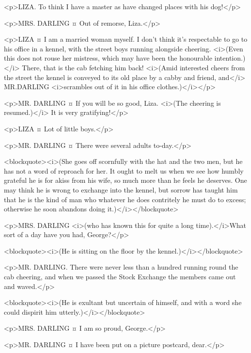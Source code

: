 <p>LIZA. To think I have a master as have changed places with his dog!</p>

<p>MRS. DARLING ¤
Out of remorse, Liza.</p>

<p>LIZA ¤
I am a married woman myself. I don't think it's respectable to go to his office in a kennel, with the street boys running alongside cheering. <i>(Even this does not rouse her mistress, which may have been the honourable intention.)</i> There, that is the cab fetching him back! <i>(Amid interested cheers from the street the kennel is conveyed to its old place by a cabby and friend, and</i> MR.DARLING <i>scrambles out of it in his office clothes.)</i></p>

<p>MR. DARLING ¤
If you will be so good, Liza. <i>(The cheering is resumed.)</i> It is very gratifying!</p>

<p>LIZA ¤
Lot of little boys.</p>

<p>MR. DARLING ¤
There were several adults to-day.</p>

<blockquote><i>(She goes off scornfully with the hat and the two men, but he has not a word of reproach for her. It ought to melt us when we see how humbly grateful he is for akiss from his wife, so much more than he feels he deserves. One may think he is wrong to exchange into the kennel, but sorrow has taught him that he is the kind of man who whatever he does contritely he must do to excess; otherwise he soon abandons doing it.)</i></blockquote>

<p>MRS. DARLING <i>(who has known this for quite a long time).</i>What sort of a day have you had, George?</p>

<blockquote><i>(He is sitting on the floor by the kennel.)</i></blockquote>

<p>MR. DARLING. There were never less than a hundred running round the cab cheering, and when we passed the Stock Exchange the members came out and waved.</p>

<blockquote><i>(He is exultant but uncertain of himself, and with a word she could dispirit him utterly.)</i></blockquote>

<p>MRS. DARLING ¤
I am so proud, George.</p>

<p>MR. DARLING ¤
I have been put on a picture postcard, dear.</p>

